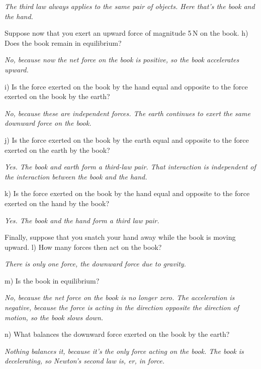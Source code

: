 \documentclass{amsart}
\begin{document}
\textit{The third law always applies to the same pair of objects.  Here that's the book and the hand.}

\vspace{\baselineskip}
\noindent
Suppose now that you exert an upward force of magnitude 5\,N on the book.\newline
h) Does the book remain in equilibrium?

\textit{No, because now the net force on the book is positive, so the book accelerates upward.}

\noindent
i) Is the force exerted on the book by the hand equal and opposite to the force exerted on the book by the earth?

\textit{No, because these are independent forces.  The earth continues to exert the same downward force on the book.}

\noindent
j) Is the force exerted on the book by the earth equal and opposite to the force exerted on the earth by the book?

\textit{Yes.  The book and earth form a third-law pair.  
That interaction is independent of the interaction between the book and the hand.}

\noindent
k) Is the force exerted on the book by the hand equal and opposite to the force exerted on the hand by the book?

\textit{Yes.  The book and the hand form a third law pair.}

\vspace{\baselineskip}
\noindent
Finally, suppose that you snatch your hand away while the book is moving upward.\newline
l) How many forces then act on the book?

\textit{There is only one force, the downward force due to gravity.}

\noindent
m) Is the book in equilibrium?

\textit{No, because the net force on the book is no longer zero.  The acceleration is negative, 
because the force is acting in the direction opposite the direction of motion, so the book slows down.}

\noindent
n) What balances the downward force exerted on the book by the earth?

\textit{Nothing balances it, because it's the only force acting on the book.  
The book is decelerating, so Newton's second law is, er, in force.}
\end{document}
